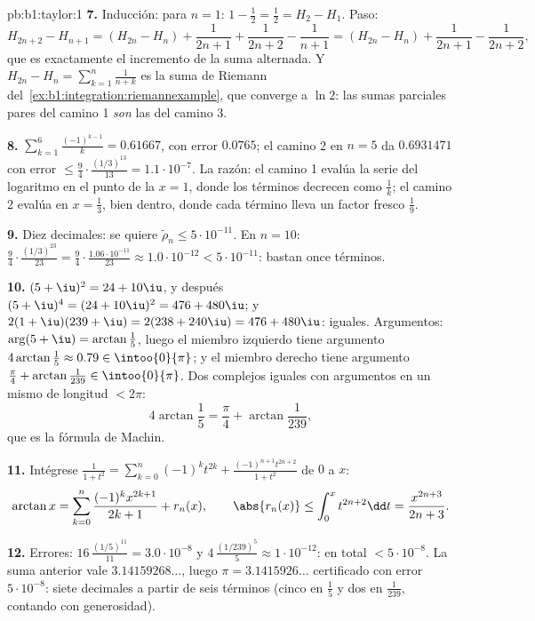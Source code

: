 \begin{solution}{pb:b1:taylor:1}
\textbf{7.} Inducción: para $n = 1$:
$1 - \frac12 = \frac12 = H_2 - H_1$. Paso:
\[
H_{2n+2} - H_{n+1} = (H_{2n} - H_n) + \frac{1}{2n+1} +
\frac{1}{2n+2} - \frac{1}{n+1}
= (H_{2n} - H_n) + \frac{1}{2n+1} - \frac{1}{2n+2},
\]
que es exactamente el incremento de la suma alternada. Y
$H_{2n} - H_n = \sum_{k=1}^{n}\frac{1}{n+k}$ es la suma de Riemann
del~\cref{ex:b1:integration:riemannexample}, que converge a $\ln 2$:
las sumas parciales pares del camino 1 \emph{son} las  del camino 3.

\textbf{8.} $\sum_{k=1}^{6}\frac{(-1)^{k-1}}{k} = 0.61667$, con
error $0.0765$; el camino 2 en $n = 5$ da $0.6931471$ con error
$\leq \frac94\cdot\frac{(1/3)^{13}}{13} = 1.1\cdot10^{-7}$. La
razón: el camino 1 evalúa la serie del logaritmo en el punto de la
 $x = 1$, donde los términos decrecen como $\frac1k$; el
camino 2 evalúa en $x = \frac13$, bien dentro, donde cada término
lleva un factor fresco $\frac19$.

\textbf{9.} Diez decimales: se quiere
$\tilde\rho_n \leq 5\cdot10^{-11}$. En $n = 10$:
$\frac94 \cdot \frac{(1/3)^{23}}{23} =
\frac94\cdot\frac{1.06\cdot10^{-11}}{23} \approx 1.0\cdot10^{-12} <
5\cdot10^{-11}$: bastan once términos.

\textbf{10.} $(5+\iu)^2 = 24 + 10\iu$, y después
$(5+\iu)^4 = (24 + 10\iu)^2 = 476 + 480\iu$; y
$2(1+\iu)(239+\iu) = 2(238 + 240\iu) = 476 + 480\iu$: iguales.
Argumentos: $\arg(5 + \iu) = \arctan\frac15$, luego el miembro
izquierdo tiene argumento
$4\arctan\frac15 \approx 0.79 \in \intoo{0}{\pi}$; y el miembro
derecho tiene argumento
$\frac\pi4 + \arctan\frac{1}{239} \in \intoo{0}{\pi}$. Dos complejos
iguales con argumentos en un mismo  de longitud $< 2\pi$:
\[
4\arctan\frac15 = \frac\pi4 + \arctan\frac{1}{239} ,
\]
que es la fórmula de Machin.

\textbf{11.} Intégrese $\frac{1}{1+t^2} = \sum_{k=0}^n (-1)^k
t^{2k} + \frac{(-1)^{n+1}t^{2n+2}}{1+t^2}$ de $0$ a $x$:
\[
\arctan x = \sum_{k=0}^{n}\frac{(-1)^k x^{2k+1}}{2k+1} +
r_n(x),
\qquad
\abs{r_n(x)} \leq \int_0^x t^{2n+2}\dd t =
\frac{x^{2n+3}}{2n+3} .
\]

\textbf{12.} Errores:
$16\,\frac{(1/5)^{11}}{11} = 3.0\cdot 10^{-8}$ y
$4\,\frac{(1/239)^5}{5} \approx 1\cdot10^{-12}$: en total
$< 5\cdot10^{-8}$. La suma anterior vale $3.14159268\dots$, luego
$\pi = 3.1415926\dots$ certificado con error $5\cdot10^{-8}$: siete
decimales a partir de seis términos (cinco en $\frac15$ y dos en
$\frac1{239}$, contando con generosidad).


\end{solution}
